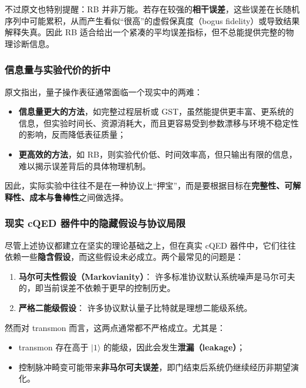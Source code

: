 \documentclass[12pt,a4paper,oneside]{ctexbook}
\begin{document}
不过原文也特别提醒：RB 并非万能。若存在较强的\textbf{相干误差}，这些误差在长随机序列中可能累积，从而产生看似“很高”的虚假保真度（bogus fidelity）或导致结果解释失真。因此 RB 适合给出一个紧凑的平均误差指标，但不总能提供完整的物理诊断信息。

\subsubsection{信息量与实验代价的折中}

原文指出，量子操作表征通常面临一个现实中的两难：

\begin{itemize}
    \item \textbf{信息量更大的方法}，如完整过程层析或 GST，虽然能提供更丰富、更系统的信息，但实验时间长、资源消耗大，而且更容易受到参数漂移与环境不稳定性的影响，反而降低表征质量；
    \item \textbf{更高效的方法}，如 RB，则实验代价低、时间效率高，但只输出有限的信息，难以揭示误差背后的具体物理机制。
\end{itemize}

因此，实际实验中往往不是在一种协议上“押宝”，而是要根据目标在\textbf{完整性、可解释性、成本与鲁棒性}之间做选择。

\subsubsection{现实 cQED 器件中的隐藏假设与协议局限}

尽管上述协议都建立在坚实的理论基础之上，但在真实 cQED 器件中，它们往往依赖一些\textbf{隐含假设}，而这些假设未必成立。两个最常见的问题是：

\begin{enumerate}
    \item \textbf{马尔可夫性假设（Markovianity）}：
    许多标准协议默认系统噪声是马尔可夫的，即当前误差不依赖于更早的控制历史。

    \item \textbf{严格二能级假设}：
    许多协议默认量子比特就是理想二能级系统。
\end{enumerate}

然而对 transmon 而言，这两点通常都不严格成立。尤其是：
\begin{itemize}
    \item transmon 存在高于 \(|1\rangle\) 的能级，因此会发生\textbf{泄漏（leakage）}；
    \item 控制脉冲畸变可能带来\textbf{非马尔可夫误差}，即门结束后系统仍继续经历非期望演化。
\end{itemize}
\end{document}

